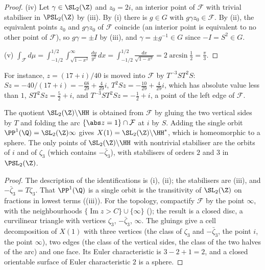 \begin{proof}
(iv) Let $\gamma\in\SL_2(\Z)$ and $z_0=2i$, an interior point of $\mathcal F$ with trivial stabiliser in $\PSL_2(\Z)$ by (iii). By (i) there is $g\in G$ with
$g\gamma z_0\in\mathcal F$. By (ii), the equivalent points $z_0$ and $g\gamma z_0$ of $\mathcal F$ coincide (an interior point is equivalent to no other point of $\mathcal F$), so
$g\gamma=\pm I$ by (iii), and $\gamma=\pm g^{-1}\in G$ since $-I=S^2\in G$.

(v) $\int_{\mathcal F}d\mu=\int_{-1/2}^{1/2}\int_{\sqrt{1-x^2}}^\infty\frac{dy}{y^2}\,dx=\int_{-1/2}^{1/2}\frac{dx}{\sqrt{1-x^2}}=2\arcsin\frac12=\frac\pi3$.
\end{proof}

For instance, $z=(17+i)/40$ is moved into $\mathcal F$ by $T^{-3}ST^2S$: $Sz=-40/(17+i)=-\frac{68}{29}+\frac4{29}i$, $T^2Sz=-\frac{10}{29}+\frac4{29}i$, which has absolute
value less than $1$, $ST^2Sz=\frac52+i$, and $T^{-3}ST^2Sz=-\frac12+i$, a point of the left edge of $\mathcal F$.

\begin{corollary}\label{cor:modforms:level-one-quotient}
The quotient $\SL_2(\Z)\backslash\HH$ is obtained from $\mathcal F$ by gluing the two vertical sides by $T$ and folding the arc $\{\abs z=1\}\cap\mathcal F$ at $i$ by $S$.
Adding the single orbit $\PP^1(\Q)=\SL_2(\Z)\infty$ gives $X(1)=\SL_2(\Z)\backslash\HH^*$, which is homeomorphic to a sphere. The only points of $\SL_2(\Z)\backslash\HH$ with
nontrivial stabiliser are the orbits of $i$ and of $\zeta_3$ (which contains $-\bar\zeta_3$), with stabilisers of orders $2$ and $3$ in $\PSL_2(\Z)$.
\end{corollary}

\begin{proof}
The description of the identifications is (i), (ii); the stabilisers are (iii), and $-\bar\zeta_3=T\zeta_3$. That
$\PP^1(\Q)$ is a single orbit is the transitivity of $\SL_2(\Z)$ on fractions in lowest terms ((iii)). For the topology, compactify
$\mathcal F$ by the point $\infty$, with the neighbourhoods $\{\operatorname{Im}z>C\}\cup\{\infty\}$ (); the result is a closed disc, a curvilinear
triangle with vertices $\zeta_3$, $-\bar\zeta_3$, $\infty$. The gluings give a cell decomposition of $X(1)$ with three vertices (the class of $\zeta_3$ and $-\bar\zeta_3$,
the point $i$, the point $\infty$), two edges (the class of the vertical sides, the class of the two halves of the arc) and one face. Its Euler characteristic
is $3-2+1=2$, and a closed orientable surface of Euler characteristic $2$ is a sphere.
\end{proof}

